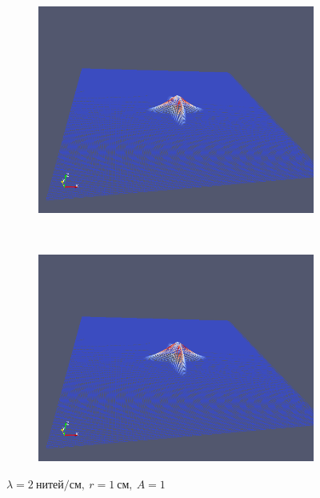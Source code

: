 \begin{figure}[H]
\begin{subfigure}[t]{0.5\textwidth}
        \includegraphics[width=\textwidth]{img/fiber/density_2_radius_1_amplitude_1/5.png}
    \end{subfigure}%
    ~
    \begin{subfigure}[t]{0.5\textwidth}
        \centering
        \includegraphics[width=\textwidth]{img/fiber/density_2_radius_1_amplitude_1/6.png}
    \end{subfigure}
    \caption{$\lambda=2~нитей/см,~r=1~см,~A=1$}
\end{figure}
